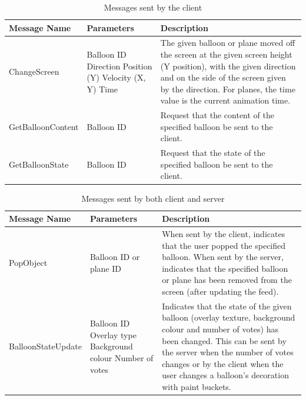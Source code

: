 \begin{table}
\begin{tabular}{|>{\raggedright}p{4.3cm}|>{\raggedright}p{2.8cm}|>{\raggedright}p{8.7cm}|}
\hline 
Message Name & Parameters & Description\tabularnewline
\hline 
ChangeScreen
& Balloon ID 
\newline Direction
\newline Position (Y)
\newline Velocity (X, Y)
\newline Time
& The given balloon or plane moved off the screen at the given screen height (Y position),
with the given direction and on the side of the screen given by the direction. For planes,
the time value is the current animation time.
\tabularnewline
\hline 
GetBalloonContent
& Balloon ID
& Request that the content of the specified balloon be sent to the client.
\tabularnewline
\hline 
GetBalloonState
& Balloon ID
& Request that the state of the specified balloon be sent to the client.
\tabularnewline
\hline 
\end{tabular}

\caption{Messages sent by the client}

\label{ClientMessages}
\end{table}

\begin{table}
\begin{tabular}{|>{\raggedright}p{4.3cm}|>{\raggedright}p{2.8cm}|>{\raggedright}p{8.7cm}|}
\hline 
Message Name & Parameters & Description\tabularnewline
\hline 
PopObject
& Balloon ID or plane ID
& When sent by the client, indicates that the user popped the specified balloon.
When sent by the server, indicates that the specified balloon or plane has been 
removed from the screen (after updating the feed).
\tabularnewline
\hline 
BalloonStateUpdate
& Balloon ID
\newline Overlay type
\newline Background colour
\newline Number of votes
& Indicates that the state of the given balloon (overlay texture, background colour
and number of votes) has been changed. This can be sent by the server when the 
number of votes changes or by the client when the user changes a balloon's 
decoration with paint buckets.
\tabularnewline
\hline 
\end{tabular}

\caption{Messages sent by both client and server}

\label{CommonMessages}
\end{table}


